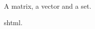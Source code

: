 \documentclass{article}
\begin{document}
A \gls{matrix}, a \gls{vector} and a \gls{set}.

\gls{shtml}.

\printunsrtglossaries
\end{document}
